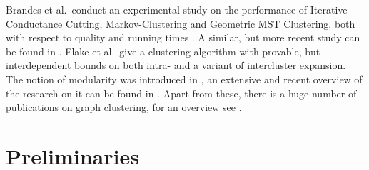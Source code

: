 \documentclass{llncs}
\begin{document}
Brandes et al.\ conduct an experimental study on the performance of Iterative Conductance Cutting, Markov-Clustering and Geometric MST Clustering, both with respect to quality and running times \cite{bgw-egcme-07}.
A similar, but more recent study can be found in \cite{lf-ca-09}.
Flake et al.\ give a clustering algorithm with provable, but interdependent bounds on both intra- and a variant of intercluster expansion.
The notion of modularity was introduced in \cite{ng-fecsn-04}, an extensive and recent overview of the research on it can be found in \cite{f-c-09}.
Apart from these, there is a huge number of publications on graph clustering, for an overview see \cite{jd-acd-88,b-ascdm-06}.    
\section{Preliminaries}
\end{document}

